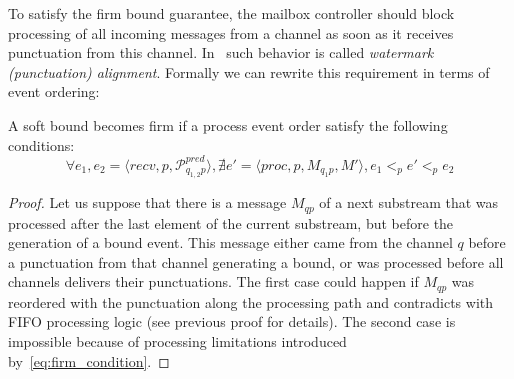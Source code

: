 To satisfy the firm bound guarantee, the mailbox controller should block processing of all incoming messages from a channel as soon as it receives punctuation from this channel. In~\cite{Carbone:2017:SMA:3137765.3137777} such behavior is called {\em watermark (punctuation) alignment}. Formally we can rewrite this requirement in terms of event ordering:

\begin{lemma}
A soft bound becomes firm if a process event order satisfy the following conditions:
\begin{equation}
  \forall e_1, e_2 = \langle recv, p, \mathcal{P}^{pred}_{q_{1,2}p} \rangle, \nexists e' = \langle proc, p, M_{q_1p}, M' \rangle, e_1 <_p e' <_p e_2
  \label{eq:firm_condition}
\end{equation}
\end{lemma}
\begin{proof}
Let us suppose that there is a message $M_{qp}$ of a next substream that was processed after the last element of the current substream, but before the generation of a bound event. This message either came from the channel $q$ before a punctuation from that channel generating a bound, or was processed before all channels delivers their punctuations. The first case could happen if $M_{qp}$ was reordered with the punctuation along the processing path and contradicts with FIFO processing logic (see previous proof for details). The second case is impossible because of processing limitations introduced by~\ref{eq:firm_condition}.
\end{proof}
